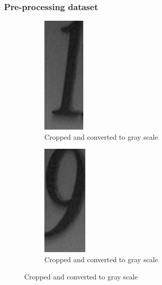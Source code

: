 \documentclass[11.5pt,aspectratio=1610,xcolor={usenames,dvipsnames,table}]{beamer}
\begin{document}
\begin{frame}
\frametitle{Pre-processing dataset}

\begin{figure}[H]
\centering
\begin{subfigure}{0.35\textwidth}
\includegraphics[height=0.45 \textheight,width=0.25 \textwidth]{images/cropped_1.png}

\caption{Cropped and converted to gray scale}
\end{subfigure}
\begin{subfigure}{0.35\textwidth}
\includegraphics[height=0.45 \textheight, width=0.25 \textwidth]{images/cropped_9.png}
\caption{Cropped and converted to gray scale}
\end{subfigure}


\end{figure}
\end{frame}
\end{document}
